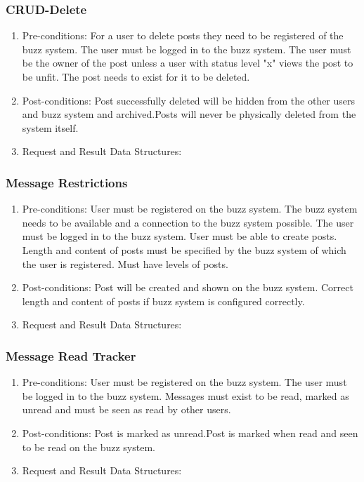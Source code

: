 \documentclass[12pt, oneside]{book}
\begin{document}
\subsubsection{CRUD-Delete}
\begin{enumerate}
 \item Pre-conditions:  For a user to delete posts they need to be registered of the buzz system. The user must be logged in to the buzz system. The user must be the owner of the post unless a user with status level "x" views the post to be unfit. The post needs to exist for it to be deleted.
 \\
 \item Post-conditions: Post successfully deleted will be hidden from the other users and buzz system and archived.Posts will never be physically deleted from the system itself.
   \\
 \item Request and Result Data Structures:
\end{enumerate}

\subsubsection{Message Restrictions}
\begin{enumerate}
 \item Pre-conditions:  User must be registered on the buzz system. The buzz system needs to be available and a connection to the buzz system possible. The user must be logged in to the buzz system. User must be able to create posts. Length and content of posts must be specified by the buzz system of which the user is registered. Must have levels of posts.
 
 \item Post-conditions: Post will be created and shown on the buzz system. Correct length and content of posts if buzz system is configured correctly.
   \\
 \item Request and Result Data Structures:
\end{enumerate}

\subsubsection{Message Read Tracker}
\begin{enumerate}
 \item Pre-conditions:  User must be registered on the buzz system. The user must be logged in to the buzz system. Messages must exist to be read, marked as unread and must be seen as read by other users.
 \\
 \item Post-conditions: Post is marked as unread.Post is marked when read and seen to be read on the buzz system.
   \\
 \item Request and Result Data Structures:
\end{enumerate}
\end{document}
